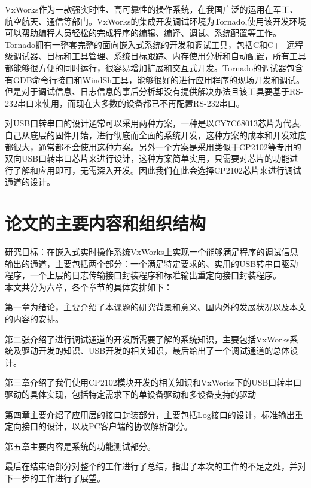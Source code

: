 	VxWorks作为一款强实时性、高可靠性的操作系统，在我国广泛的运用在军工、航空航天、通信等部门。VxWorks的集成开发调试环境为Tornado,使用该开发环境可以帮助编程人员轻松的完成程序的编辑、编译、调试、系统配置等工作。Tornado拥有一整套完整的面向嵌入式系统的开发和调试工具，包括C和C++远程级调试器、目标和工具管理、系统目标跟踪、内存使用分析和自动配置，所有工具都能够很方便的同时运行，很容易增加扩展和交互式开发。Tornado的调试器包含有GDB命令行接口和WindSh工具，能够很好的进行应用程序的现场开发和调试。但是对于调试信息、日志信息的事后分析却没有提供解决办法且该工具要基于RS-232串口来使用，而现在大多数的设备都已不再配置RS-232串口。
	
	对USB口转串口的设计通常可以采用两种方案，一种是以CY7C68013芯片为代表,自己从底层的固件开始，进行彻底而全面的系统开发，这种方案的成本和开发难度都很大，通常都不会使用这种方案。另外一个方案是采用类似于CP2102等专用的双向USB口转串口芯片来进行设计，这种方案简单实用，只需要对芯片的功能进行了解和应用即可，无需深入开发。因此我们在此会选择CP2102芯片来进行调试通道的设计。
	

\section{论文的主要内容和组织结构}	
	研究目标：在嵌入式实时操作系统VxWorks上实现一个能够满足程序的调试信息输出的通道，主要包括两个部分：一个满足特定要求的、实用的USB转串口驱动程序，一个上层的日志传输接口封装程序和标准输出重定向接口封装程序。\\
 本文共分为六章，各个章节的具体安排如下：
 
 第一章为绪论，主要介绍了本课题的研究背景和意义、国内外的发展状况以及本文的内容的安排。
 
 第二张介绍了进行调试通道的开发所需要了解的系统知识，主要包括VxWorks系统及驱动开发的知识、USB开发的相关知识，最后给出了一个调试通道的总体设计。
 
 第三章介绍了我们使用CP2102模块开发的相关知识和VxWorks下的USB口转串口驱动的具体实现，包括特定需求下的单设备驱动和多设备支持的驱动
 
 第四章主要介绍了应用层的接口封装部分，主要包括Log接口的设计，标准输出重定向接口的设计，以及PC客户端的协议解析部分。
 
 第五章主要内容是系统的功能测试部分。
 
 最后在结束语部分对整个的工作进行了总结，指出了本次的工作的不足之处，并对下一步的工作进行了展望。 

\